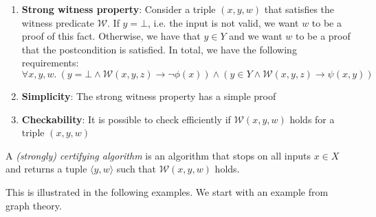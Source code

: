 \begin{enumerate}
    \item \textbf{Strong witness property}: Consider a triple $(x,y,w)$ that satisfies the witness predicate $\mathcal{W}$. If $y=\bot$, i.e. the input is not valid, we want $w$ to be a proof of this fact. Otherwise, we have that $y\in Y$ and we want $w$ to be a proof that the postcondition is satisfied. In total, we have the following requirements:
    \[ \forall x,y,w.\ (y = \bot \land \mathcal{W}(x,y,z) \rightarrow \neg \phi(x)) \land (y \in Y \land \mathcal{W}(x,y,z) \rightarrow \psi(x,y)) \]
    \item \textbf{Simplicity}: The strong witness property has a simple proof
    \item \textbf{Checkability}: It is possible to check efficiently if $\mathcal{W}(x,y,w)$ holds for a triple $(x,y,w)$
\end{enumerate}

A \textit{(strongly) certifying algorithm} is an algorithm that stops on all inputs $x \in X$ and returns a tuple $\langle y, w\rangle$ such that $\mathcal{W}(x,y,w)$ holds.

This is illustrated in the following examples. We start with an example from graph theory.

